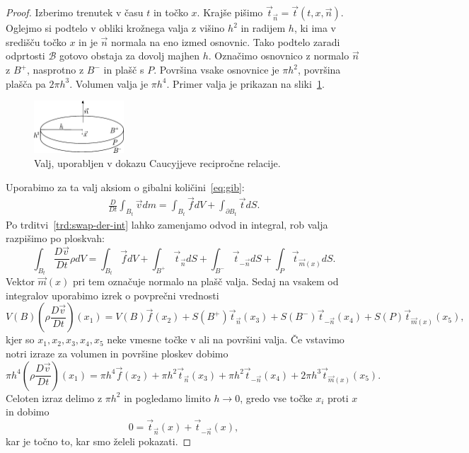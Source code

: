 \documentclass[12pt,a4paper,twoside]{article}
\theoremstyle{definition} %
\theoremstyle{plain} %
\numberwithin{equation}{section}
\newcommand{\B}{\mathcal{B}}
\newcommand{\DD}[2]{\ensuremath{\frac{D #1}{D #2}}}
\newcommand{\DDt}[1]{\DD{#1}{t}}
\newcommand{\vv}{\vec{v}}
\newcommand{\vt}{\vec{t}}
\newcommand{\vn}{\vec{n}}
\newcommand{\vf}{\vec{f}}
\newcommand{\vm}{\vec{m}}
\newcommand{\vx}{x}
\begin{document}
\begin{proof}
Izberimo trenutek v času $t$ in točko $\vx$. Krajše pišimo $\vt_{\vn} = \vt(t, \vx,
\vn)$. Oglejmo si podtelo v obliki krožnega valja z višino $h^2$ in radijem $h$, ki ima
v središču točko $\vx$ in je $\vn$ normala na eno izmed osnovnic.
Tako podtelo zaradi odprtosti $\B$ gotovo obstaja za dovolj majhen $h$. Označimo
osnovnico z normalo $\vn$ z $B^+$, nasprotno z $B^-$ in plašč s $P$. Površina
vsake osnovnice je $\pi h^2$, površina plašča pa $2 \pi h^3$. Volumen valja je
$\pi h^4$. Primer valja je prikazan na sliki~\ref{fig:valj}.

\begin{figure}[h]
  \centering
  \includegraphics[width=0.3\textwidth]{images/cauchy_disc.pdf}
  \caption{Valj, uporabljen v dokazu Caucyjjeve recipročne relacije.}
  \label{fig:valj}
\end{figure}

Uporabimo za ta
valj aksiom o gibalni količini~\eqref{eq:gib}:
\begin{align*}
  \DDt{} \int_{B_t} \vv dm = \int_{B_t} \vf dV + \int_{\partial B_t} \vt dS.
\end{align*}
Po trditvi~\ref{trd:swap-der-int} lahko zamenjamo odvod in integral, rob valja
razpišimo po ploskvah:
\[
  \int_{B_t} \DDt{\vv} \rho dV = \int_{B_t} \vf dV + \int_{B^+} \vt_{\vn} dS +
  \int_{B^-}\vt_{-\vn} dS + \int_{P} \vt_{\vm(\vx)}dS.
\]
Vektor $\vm(\vx)$ pri tem označuje normalo na plašč valja.
Sedaj na vsakem od integralov uporabimo izrek o povprečni vrednosti
\[
  V(B) (\rho\DDt{\vv})(\vx_1) = V(B) \vf(\vx_2) + S(B^+)\vt_{\vn}(\vx_3) +
  S(B^-)\vt_{-\vn}(\vx_4) + S(P)\vt_{\vm(\vx)}(\vx_5),
\]
kjer so $\vx_1, \vx_2, \vx_3, \vx_4, \vx_5$ neke vmesne točke v ali na površini valja.
Če vstavimo notri izraze za volumen in površine ploskev dobimo
\[
  \pi h^4 (\rho \DDt{\vv})(\vx_1) = \pi h^4 \vf(\vx_2) + \pi h^2 \vt_{\vn}(\vx_3) +
  \pi h^2 \vt_{-\vn}(\vx_4) + 2 \pi h^3 \vt_{\vm(x)}(\vx_5).
\]
Celoten izraz delimo z $\pi h^2$ in pogledamo limito $h\to 0$, gredo vse točke
$\vx_i$ proti $\vx$ in dobimo
\[
  0 = \vt_{\vn}(\vx) + \vt_{-\vn}(\vx),
\]
kar je točno to, kar smo želeli pokazati.
\end{proof}
\end{document}
